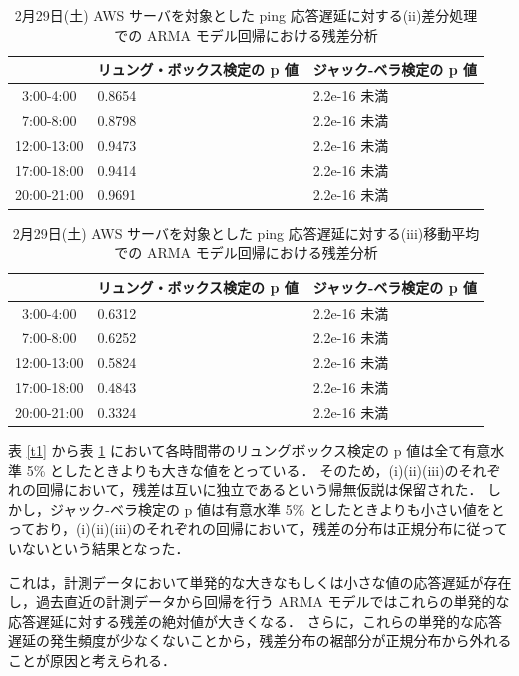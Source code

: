 \documentclass[a4j]{jarticle}
\begin{document}
\begin{table}[H]
\begin{center}
\caption{2月29日(土) AWS サーバを対象とした ping 応答遅延に対する(ii)差分処理での ARMA モデル回帰における残差分析}
\begin{tabular}{|c|l|l|}
\hline
 &リュング・ボックス検定の p 値&ジャック-ベラ検定の p 値\\
\hline
3:00-4:00&0.8654&2.2e-16 未満\\
\hline
7:00-8:00&0.8798&2.2e-16 未満\\
\hline
12:00-13:00&0.9473&2.2e-16 未満\\
\hline
17:00-18:00&0.9414&2.2e-16 未満\\
\hline
20:00-21:00&0.9691&2.2e-16 未満\\
\hline
\end{tabular}
\end{center}
\end{table}

\begin{table}[H]
\begin{center}
\caption{2月29日(土) AWS サーバを対象とした ping 応答遅延に対する(iii)移動平均での ARMA モデル回帰における残差分析}
\label{t2}
\begin{tabular}{|c|l|l|}
\hline
 &リュング・ボックス検定の p 値&ジャック-ベラ検定の p 値\\
\hline
3:00-4:00&0.6312&2.2e-16 未満\\
\hline
7:00-8:00&0.6252&2.2e-16 未満\\
\hline
12:00-13:00&0.5824&2.2e-16 未満\\
\hline
17:00-18:00&0.4843&2.2e-16 未満\\
\hline
20:00-21:00&0.3324&2.2e-16 未満\\
\hline
\end{tabular}
\end{center}
\end{table}

表 \ref{t1} から表 \ref{t2} において各時間帯のリュングボックス検定の p 値は全て有意水準 5\% としたときよりも大きな値をとっている．
そのため，(i)(ii)(iii)のそれぞれの回帰において，残差は互いに独立であるという帰無仮説は保留された．
しかし，ジャック-ベラ検定の p 値は有意水準 5\% としたときよりも小さい値をとっており，(i)(ii)(iii)のそれぞれの回帰において，残差の分布は正規分布に従っていないという結果となった．

これは，計測データにおいて単発的な大きなもしくは小さな値の応答遅延が存在し，過去直近の計測データから回帰を行う ARMA モデルではこれらの単発的な応答遅延に対する残差の絶対値が大きくなる．
さらに，これらの単発的な応答遅延の発生頻度が少なくないことから，残差分布の裾部分が正規分布から外れることが原因と考えられる．
\end{document}
